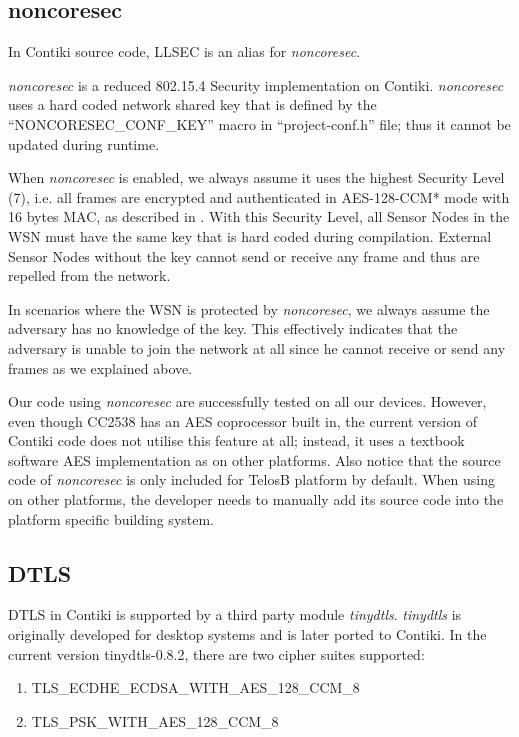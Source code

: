 \subsection{noncoresec}

In Contiki source code, LLSEC is an alias for \textit{noncoresec}.

\textit{noncoresec}\cite{noncoresec}\cite{LLSEC} is a reduced 802.15.4 Security implementation on Contiki. \textit{noncoresec} uses a hard coded network shared key that is defined by the ``NONCORESEC\_CONF\_KEY'' macro in ``project-conf.h'' file; thus it cannot be updated during runtime. 

When \textit{noncoresec} is enabled, we always assume it uses the highest Security Level (7), i.e. all frames are encrypted and authenticated in AES-128-CCM* mode with 16 bytes MAC, as described in . With this Security Level, all Sensor Nodes in the WSN must have the same key that is hard coded during compilation. External Sensor Nodes without the key cannot send or receive any frame and thus are repelled from the network.

In scenarios where the WSN is protected by \textit{noncoresec}, we always assume the adversary has no knowledge of the key. This effectively indicates that the adversary is unable to join the network at all since he cannot receive or send any frames as we explained above.

Our code using \textit{noncoresec} are successfully tested on all our devices. However, even though CC2538 has an AES coprocessor built in, the current version of Contiki code does not utilise this feature at all; instead, it uses a textbook software AES implementation as on other platforms. Also notice that the source code of \textit{noncoresec} is only included for TelosB platform by default. When using on other platforms, the developer needs to manually add its source code into the platform specific building system.

\subsection{DTLS} \label{Subsec: Experiment DTLS}

DTLS in Contiki is supported by a third party module \textit{tinydtls}\cite{tinydtls}. \textit{tinydtls} is originally developed for desktop systems and is later ported to Contiki. In the current version tinydtls-0.8.2, there are two cipher suites supported:

\begin{enumerate}
	\item TLS\_ECDHE\_ECDSA\_WITH\_AES\_128\_CCM\_8\cite{rfc7251}
	\item TLS\_PSK\_WITH\_AES\_128\_CCM\_8\cite{rfc6655}
\end{enumerate}

